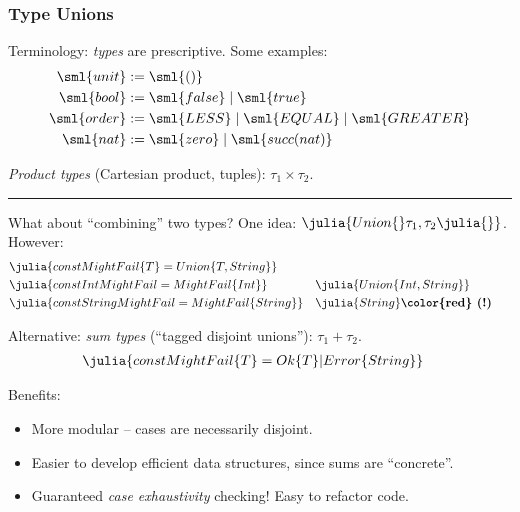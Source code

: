 \documentclass[8pt]{beamer}
\newcommand{\yikes}{\textbf{\color{red}\ (!) }}
\begin{document}
\begin{frame}
  \frametitle{Type Unions}

  Terminology: \emph{types} are prescriptive. Some examples:
  \begin{align*}
    \sml{unit}  &:= \sml{()} \\
    \sml{bool}  &:= \sml{false} \mid \sml{true} \\
    \sml{order} &:= \sml{LESS} \mid \sml{EQUAL} \mid \sml{GREATER} \\
    \sml{nat}   &:= \sml{zero} \mid \sml{succ(nat)}
  \end{align*}

  \textit{Product types} (Cartesian product, tuples): $\tau_1 \times \tau_2$.

  \noindent\rule{\linewidth}{0.4pt}

  What about ``combining'' two types? One idea: $\julia{Union\{}\tau_1,\tau_2\julia{\}}$. However:
  \begin{align*}
    &\julia{const MightFail\{T\} = Union\{T,String\}} \\
    &\julia{const IntMightFail = MightFail\{Int\}} &&\julia{Union\{Int,String\}} \\
    &\julia{const StringMightFail = MightFail\{String\}} &&\julia{String} \yikes
  \end{align*}

  Alternative: \textit{sum types} (``tagged disjoint unions''): $\tau_1 + \tau_2$.
  \begin{align*}
    &\julia{const MightFail\{T\} = Ok\{T\} | Error\{String\}}
  \end{align*}

  Benefits:
  \begin{itemize}
    \item More modular -- cases are necessarily disjoint.
    \item Easier to develop efficient data structures, since sums are ``concrete''.
    \item Guaranteed \emph{case exhaustivity} checking! Easy to refactor code.
  \end{itemize}
\end{frame}
\end{document}
